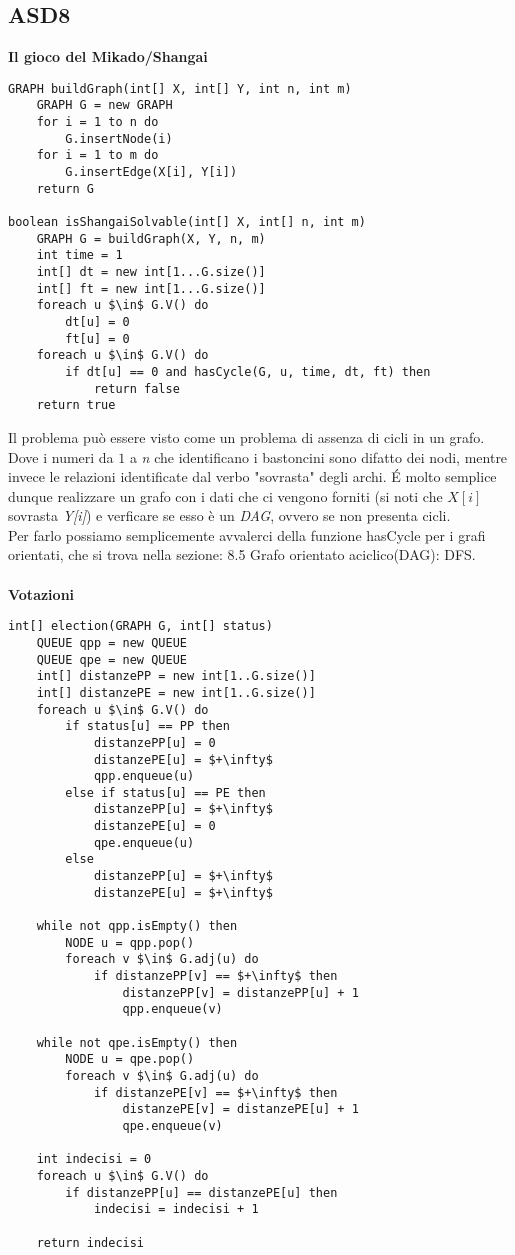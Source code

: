 \documentclass[../cheatSheetAlgoritmi.tex]{subfiles}
\begin{document}
\subsection{ASD8}
\textbf{Il gioco del Mikado/Shangai}
\begin{lstlisting}[caption=Posso vincere Mikado/Shangai in un unico turno?]
GRAPH buildGraph(int[] X, int[] Y, int n, int m)
	GRAPH G = new GRAPH
  	for i = 1 to n do
    	G.insertNode(i)
  	for i = 1 to m do
    	G.insertEdge(X[i], Y[i])
  	return G

boolean isShangaiSolvable(int[] X, int[] n, int m)
	GRAPH G = buildGraph(X, Y, n, m)
  	int time = 1
  	int[] dt = new int[1...G.size()]
  	int[] ft = new int[1...G.size()]
  	foreach u $\in$ G.V() do
    	dt[u] = 0
    	ft[u] = 0
  	foreach u $\in$ G.V() do
    	if dt[u] == 0 and hasCycle(G, u, time, dt, ft) then
      		return false
  	return true
\end{lstlisting}
Il problema può essere visto come un problema di assenza di cicli in un grafo. Dove i numeri da $1$ a \textit{n} che identificano i bastoncini sono difatto dei nodi, mentre invece le relazioni identificate dal verbo "sovrasta" degli archi. É molto semplice dunque realizzare un grafo con i dati che ci vengono forniti (si noti che $X[i]$ sovrasta \textit{Y[i]}) e verficare se esso è un \textit{DAG}, ovvero se non presenta cicli. \\ 
Per farlo possiamo semplicemente avvalerci della funzione hasCycle per i grafi orientati, che si trova nella sezione: 8.5 Grafo orientato aciclico(DAG): DFS.\\\\
\textbf{Votazioni}
\begin{lstlisting}[caption=Le votazioni]
int[] election(GRAPH G, int[] status)
	QUEUE qpp = new QUEUE
  	QUEUE qpe = new QUEUE
  	int[] distanzePP = new int[1..G.size()]
  	int[] distanzePE = new int[1..G.size()]
  	foreach u $\in$ G.V() do
    	if status[u] == PP then
      		distanzePP[u] = 0
      		distanzePE[u] = $+\infty$
      		qpp.enqueue(u)
    	else if status[u] == PE then
      		distanzePP[u] = $+\infty$
      		distanzePE[u] = 0
      		qpe.enqueue(u)
    	else
      		distanzePP[u] = $+\infty$
      		distanzePE[u] = $+\infty$

  	while not qpp.isEmpty() then
    	NODE u = qpp.pop()
    	foreach v $\in$ G.adj(u) do
      		if distanzePP[v] == $+\infty$ then
        		distanzePP[v] = distanzePP[u] + 1
        		qpp.enqueue(v)
  
  	while not qpe.isEmpty() then
    	NODE u = qpe.pop()
    	foreach v $\in$ G.adj(u) do
      		if distanzePE[v] == $+\infty$ then
        		distanzePE[v] = distanzePE[u] + 1
        		qpe.enqueue(v)
  
  	int indecisi = 0
  	foreach u $\in$ G.V() do
    	if distanzePP[u] == distanzePE[u] then
      		indecisi = indecisi + 1
  
  	return indecisi
\end{lstlisting}
\end{document}
